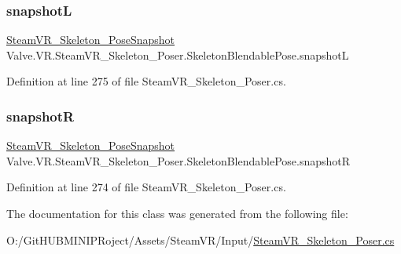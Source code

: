 \subsubsection{\texorpdfstring{snapshotL}{snapshotL}}
{\footnotesize\ttfamily \mbox{\hyperlink{class_valve_1_1_v_r_1_1_steam_v_r___skeleton___pose_snapshot}{Steam\+V\+R\+\_\+\+Skeleton\+\_\+\+Pose\+Snapshot}} Valve.\+V\+R.\+Steam\+V\+R\+\_\+\+Skeleton\+\_\+\+Poser.\+Skeleton\+Blendable\+Pose.\+snapshotL}



Definition at line 275 of file Steam\+V\+R\+\_\+\+Skeleton\+\_\+\+Poser.\+cs.

\mbox{\label{class_valve_1_1_v_r_1_1_steam_v_r___skeleton___poser_1_1_skeleton_blendable_pose_af8bf7acca7e5db9fae2f57540bbd6df7}} 
\subsubsection{\texorpdfstring{snapshotR}{snapshotR}}
{\footnotesize\ttfamily \mbox{\hyperlink{class_valve_1_1_v_r_1_1_steam_v_r___skeleton___pose_snapshot}{Steam\+V\+R\+\_\+\+Skeleton\+\_\+\+Pose\+Snapshot}} Valve.\+V\+R.\+Steam\+V\+R\+\_\+\+Skeleton\+\_\+\+Poser.\+Skeleton\+Blendable\+Pose.\+snapshotR}



Definition at line 274 of file Steam\+V\+R\+\_\+\+Skeleton\+\_\+\+Poser.\+cs.



The documentation for this class was generated from the following file\+:\begin{DoxyCompactItemize}
\item 
O\+:/\+Git\+H\+U\+B\+M\+I\+N\+I\+P\+Roject/\+Assets/\+Steam\+V\+R/\+Input/\mbox{\hyperlink{_steam_v_r___skeleton___poser_8cs}{Steam\+V\+R\+\_\+\+Skeleton\+\_\+\+Poser.\+cs}}\end{DoxyCompactItemize}
